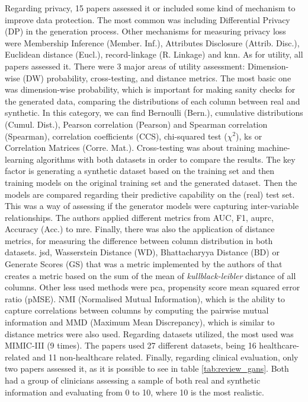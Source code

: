 Regarding privacy, 15 papers assessed it or included some kind of mechanism to improve data protection. The most common was including Differential Privacy (DP) in the generation process. Other mechanisms for measuring privacy loss were Membership Inference (Member. Inf.), Attributes Disclosure (Attrib. Disc.), Euclidean distance (Eucl.), record-linkage (R. Linkage) and \ac{knn}.
As for utility, all papers assessed it. There were 3 major areas of utility assessment: Dimension-wise (DW) probability, cross-testing, and distance metrics. The most basic one was dimension-wise probability, which is important for making sanity checks for the generated data, comparing the distributions of each column between real and synthetic. In this category, we can find Bernoulli (Bern.), cumulative distributions (Cumul. Dist.), Pearson correlation (Pearson) and Spearman correlation (Spearman), correlation coefficients (CCS), chi-squared test ($\chi^{2}$),  \ac{ks} or Correlation Matrices (Corre. Mat.).
Cross-testing was about training machine-learning algorithms with both datasets in order to compare the results. The key factor is generating a synthetic dataset based on the training set and then training models on the original training set and the generated dataset. Then the models are compared regarding their predictive capability on the (real) test set. This was a way of assessing if the generator models were capturing inter-variable relationships. The authors applied different metrics from AUC, F1, \ac{auprc}, Accuracy (Acc.) to \ac{mre}. Finally, there was also the application of distance metrics, for measuring the difference between column distribution in both datasets. \acl{jsd}, Wasserstein Distance (WD), Bhattacharyya Distance (BD) or Generate Scores (GS) that was a metric implemented by the authors of \cite{liu_ppgan_2019} that creates a metric based on the sum of the mean of \textit{kullblack-leibler}  distance of all columns. Other less used methods were \ac{pca}, propensity score mean squared error ratio (pMSE). NMI (Normalised Mutual Information), which is the ability to capture correlations between columns by computing the pairwise mutual information and MMD (Maximum Mean Discrepancy), which is similar to distance metrics were also used. Regarding datasets utilized, the most used was MIMIC-III \cite{mimiciii} (9 times). The papers used 27 different datasets, being 16 healthcare-related and 11 non-healthcare related. 
Finally, regarding clinical evaluation, only two papers assessed it, as it is possible to see in table \ref{tab:review_gans}. Both had a group of clinicians assessing a sample of both real and synthetic information and evaluating from 0 to 10, where 10 is the most realistic.
